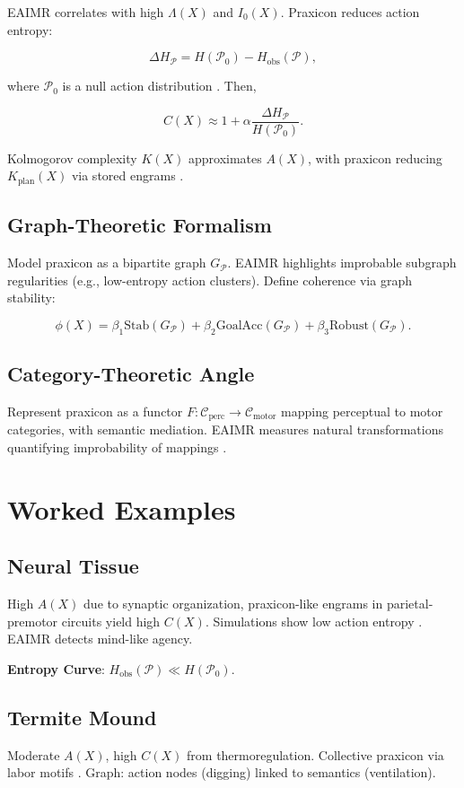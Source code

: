 \documentclass{article}
\begin{document}
EAIMR correlates with high \(\Lambda(X)\) and \(I_0(X)\). Praxicon reduces action entropy:

\[
\Delta H_{\mathcal{P}} = H(\mathcal{P}_0) - H_{\text{obs}}(\mathcal{P}),
\]

where \(\mathcal{P}_0\) is a null action distribution \citep{shannon1948}. Then,

\[
C(X) \approx 1 + \alpha \frac{\Delta H_{\mathcal{P}}}{H(\mathcal{P}_0)}.
\]

Kolmogorov complexity \(K(X)\) approximates \(A(X)\), with praxicon reducing \(K_{\text{plan}}(X)\) via stored engrams \citep{kolmogorov1965}.

\subsection{Graph-Theoretic Formalism}
Model praxicon as a bipartite graph \(G_{\mathcal{P}}\). EAIMR highlights improbable subgraph regularities (e.g., low-entropy action clusters). Define coherence via graph stability:

\[
\phi(X) = \beta_1 \text{Stab}(G_{\mathcal{P}}) + \beta_2 \text{GoalAcc}(G_{\mathcal{P}}) + \beta_3 \text{Robust}(G_{\mathcal{P}}).
\]

\subsection{Category-Theoretic Angle}
Represent praxicon as a functor \(F: \mathcal{C}_{\text{perc}} \to \mathcal{C}_{\text{motor}}\) mapping perceptual to motor categories, with semantic mediation. EAIMR measures natural transformations quantifying improbability of mappings \citep{jaynes2003}.

\section{Worked Examples}
\label{sec:examples}

\subsection{Neural Tissue}
High \(A(X)\) due to synaptic organization, praxicon-like engrams in parietal-premotor circuits yield high \(C(X)\). Simulations show low action entropy \citep{vannuscorps2023}. EAIMR detects mind-like agency.

\textbf{Entropy Curve}: \(H_{\text{obs}}(\mathcal{P}) \ll H(\mathcal{P}_0)\).

\subsection{Termite Mound}
Moderate \(A(X)\), high \(C(X)\) from thermoregulation. Collective praxicon via labor motifs \citep{turner2000}. Graph: action nodes (digging) linked to semantics (ventilation).
\end{document}
